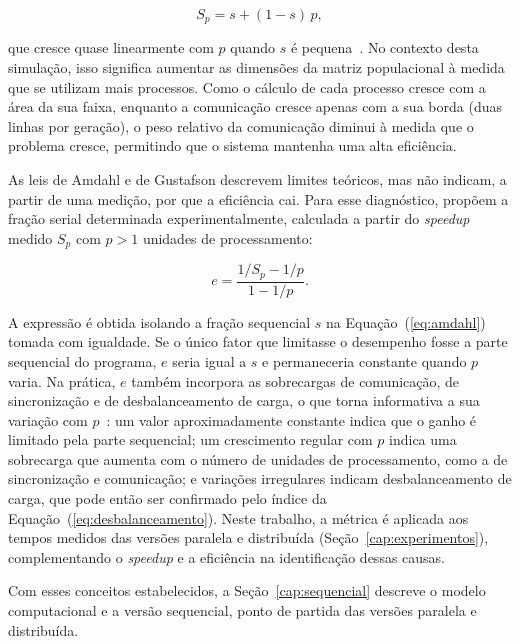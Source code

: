\begin{equation}\label{eq:gustafson}
    S_p = s + (1-s)\,p,
\end{equation}

\noindent que cresce quase linearmente com $p$ quando $s$ é pequena~\cite{Gustafson1988,Eijkhout2016}. No contexto desta simulação, isso significa aumentar as dimensões da matriz populacional à medida que se utilizam mais processos. Como o cálculo de cada processo cresce com a área da sua faixa, enquanto a comunicação cresce apenas com a sua borda (duas linhas por geração), o peso relativo da comunicação diminui à medida que o problema cresce, permitindo que o sistema mantenha uma alta eficiência.

As leis de Amdahl e de Gustafson descrevem limites teóricos, mas não indicam, a partir de uma medição, por que a eficiência cai. Para esse diagnóstico,  propõem a fração serial determinada experimentalmente, calculada a partir do \textit{speedup} medido $S_p$ com $p > 1$ unidades de processamento:

\begin{equation}\label{eq:karp-flatt}
    e = \frac{1/S_p - 1/p}{1 - 1/p}.
\end{equation}

\noindent A expressão é obtida isolando a fração sequencial $s$ na Equação~(\ref{eq:amdahl}) tomada com igualdade. Se o único fator que limitasse o desempenho fosse a parte sequencial do programa, $e$ seria igual a $s$ e permaneceria constante quando $p$ varia. Na prática, $e$ também incorpora as sobrecargas de comunicação, de sincronização e de desbalanceamento de carga, o que torna informativa a sua variação com $p$~\cite{KarpFlatt1990}: um valor aproximadamente constante indica que o ganho é limitado pela parte sequencial; um crescimento regular com $p$ indica uma sobrecarga que aumenta com o número de unidades de processamento, como a de sincronização e comunicação; e variações irregulares indicam desbalanceamento de carga, que pode então ser confirmado pelo índice da Equação~(\ref{eq:desbalanceamento}). Neste trabalho, a métrica é aplicada aos tempos medidos das versões paralela e distribuída (Seção~\ref{cap:experimentos}), complementando o \textit{speedup} e a eficiência na identificação dessas causas.

Com esses conceitos estabelecidos, a Seção~\ref{cap:sequencial} descreve o modelo computacional e a versão sequencial, ponto de partida das versões paralela e distribuída.
